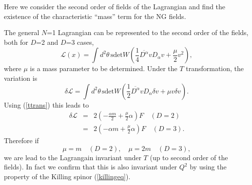 \documentclass[a4paper,12pt]{article}
\begin{document}
Here we consider the second order of fields of the Lagrangian
and find the existence of the characteristic ``mass'' term 
for the NG fields.

The general $N$=1 Lagrangian can be represented to the second
order of the fields, both for $D$=2 and $D$=3 cases,
\begin{equation}
 \mathcal{L}(x) = \int\!d^{2}\theta\,
  \mathrm{sdet}W
  \left(\frac{1}{4}\overline{D^{\alpha}}vD_{\alpha}v 
   + \frac{\mu}{2} v^{2}\right), \label{laglag}
\end{equation}
where $\mu$ is a mass parameter to be determined. 
Under the $T$ transformation,
the variation is
\begin{equation}
 \delta\mathcal{L} = \int\!d^{2}\theta\,
	\mathrm{sdet}W
  \left(\frac{1}{2}\overline{D^{\alpha}}vD_{\alpha}\delta v
   + \mu v\delta v\right).
   \label{parlagc}
\end{equation}
Using (\ref{ttrans}) this leads to
\begin{eqnarray}
 \delta\mathcal{L}
  &=& 2\left(-\frac{\alpha m}{2} + \frac{\mu}{2}\alpha \right)F \quad (D=2) \\
  &=& 2\left(-\alpha m + \frac{\mu}{2}\alpha \right)F \quad (D=3). \nonumber
\end{eqnarray}
Therefore if
\begin{equation}
 \mu = m \quad(D=2),\quad \mu=2m \quad(D=3),
	\label{valuec}
\end{equation}
we are lead to the Lagrangain invariant under $T$ (up to
second order of the fields). 
In fact we confirm that this is also invariant under $Q^{2}$ by
using the property of the Killing spinor (\ref{killingeq}). 
\end{document}
